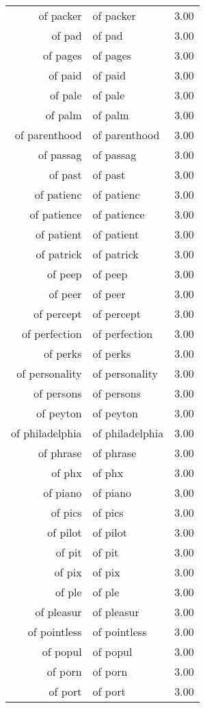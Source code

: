 \begin{table}[ht]
\begin{tabular}{rlr}
  of packer & of packer & 3.00 \\ 
  of pad & of pad & 3.00 \\ 
  of pages & of pages & 3.00 \\ 
  of paid & of paid & 3.00 \\ 
  of pale & of pale & 3.00 \\ 
  of palm & of palm & 3.00 \\ 
  of parenthood & of parenthood & 3.00 \\ 
  of passag & of passag & 3.00 \\ 
  of past & of past & 3.00 \\ 
  of patienc & of patienc & 3.00 \\ 
  of patience & of patience & 3.00 \\ 
  of patient & of patient & 3.00 \\ 
  of patrick & of patrick & 3.00 \\ 
  of peep & of peep & 3.00 \\ 
  of peer & of peer & 3.00 \\ 
  of percept & of percept & 3.00 \\ 
  of perfection & of perfection & 3.00 \\ 
  of perks & of perks & 3.00 \\ 
  of personality & of personality & 3.00 \\ 
  of persons & of persons & 3.00 \\ 
  of peyton & of peyton & 3.00 \\ 
  of philadelphia & of philadelphia & 3.00 \\ 
  of phrase & of phrase & 3.00 \\ 
  of phx & of phx & 3.00 \\ 
  of piano & of piano & 3.00 \\ 
  of pics & of pics & 3.00 \\ 
  of pilot & of pilot & 3.00 \\ 
  of pit & of pit & 3.00 \\ 
  of pix & of pix & 3.00 \\ 
  of ple & of ple & 3.00 \\ 
  of pleasur & of pleasur & 3.00 \\ 
  of pointless & of pointless & 3.00 \\ 
  of popul & of popul & 3.00 \\ 
  of porn & of porn & 3.00 \\ 
  of port & of port & 3.00 \\ 

\end{tabular}
\end{table}
